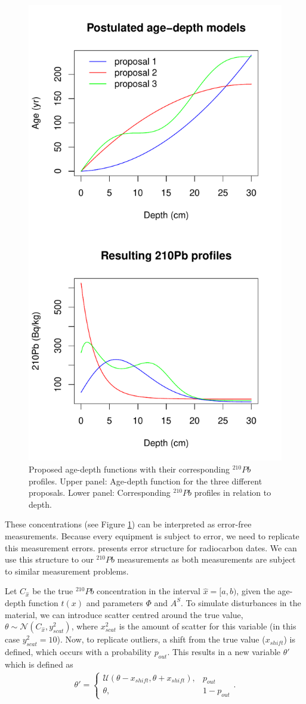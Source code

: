 \documentclass [10pt] {article}
\begin{document}
\begin{figure}[!h]
 \centering
  \includegraphics[width=0.5\linewidth]{Chronology-profile.pdf}
	\caption{Proposed age-depth functions with their corresponding $^{210}Pb$ profiles. Upper panel: Age-depth function for the three different proposals. Lower panel: Corresponding $^{210}Pb$ profiles in relation to depth.}
  \label{fig:true_210}
\end{figure}

	These concentrations (see Figure \ref{fig:true_210}) can be interpreted as error-free measurements. 
Because every equipment is subject to error, we need to replicate this measurement errors. 
\citet{Blaauw2018} presents error structure for radiocarbon dates. 
We can use this structure to our $^{210}Pb$ measurements as both measurements are subject to similar measurement problems. 

	Let $C_{\hat{x}}$ be the true  $^{210}Pb$ concentration in the interval $\hat{x}=[a,b)$, given the age-depth function $t(x)$ and parameters $\Phi$ and $A^S$. 
To simulate disturbances in the material, we can introduce scatter centred around the true value, $\theta \sim \mathcal{N}\left(C_{\hat{x}},y^2_{scat}\right)$, where $x^2_{scat}$ is the amount of scatter for this variable (in this case $y^2_{scat}=10$). 
Now, to replicate outliers, a shift from the true value ($x_{shift}$) is defined, which occurs with a probability $p_{out}$. This results in a new variable $\theta'$ which is defined as
\begin{align}
	\theta' = \begin{cases}
			\mathcal{U}(\theta - x_{shift},\theta + x_{shift}), &  p_{out} \\
			\theta, & 1-p_{out}
		\end{cases}.
\end{align}
\end{document}
